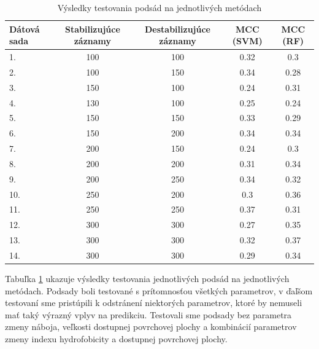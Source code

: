 \begin{table}[H]
	\centering
	\begin{tabular}{ |l | c | c | c | c|}
		\hline 
		Dátová sada & Stabilizujúce záznamy & Destabilizujúce záznamy & MCC (SVM) & MCC (RF)  \\ \hline
	1. & 100 & 100 & 0.32 & 0.3\\ \hline
	2. & 100 & 150 & 0.34 & 0.28\\ \hline
	3. & 150 & 100 & 0.24 & 0.31\\ \hline
	4. & 130 & 100 & 0.25 & 0.24\\ \hline
	5. & 150 & 150 & 0.33 & 0.29\\ \hline
	6. & 150 & 200 & 0.34 & 0.34\\ \hline
	7. & 200 & 150 & 0.24 & 0.3\\ \hline
	8. & 200 & 200 & 0.31 & 0.34\\ \hline
	9. & 200 & 250 & 0.34 & 0.32\\ \hline
	10. & 250 & 200 & 0.3 & 0.36\\ \hline
	11. & 250 & 250 & 0.37 & 0.31\\ \hline
	12. & 300 & 300 & 0.27 & 0.35\\ \hline
	13. & 300 & 300 & 0.32 & 0.37\\ \hline
	14. & 300 & 300 & 0.29 & 0.34\\ \hline
	\end{tabular}
	\caption {Výsledky testovania podsád na jednotlivých metódach} \label{pythontest} 
\end{table}

Tabuľka \ref{pythontest} ukazuje výsledky testovania jednotlivých podsád na jednotlivých metódach. Podsady boli testované s prítomnosťou všetkých parametrov, v ďaľšom testovaní sme pristúpili k odstránení niektorých parametrov, ktoré by nemuseli mať taký výrazný vplyv na predikciu. Testovali sme podsady bez parametra zmeny náboja, veľkosti dostupnej povrchovej plochy a kombinácií parametrov zmeny indexu hydrofobicity a dostupnej povrchovej plochy.
      
